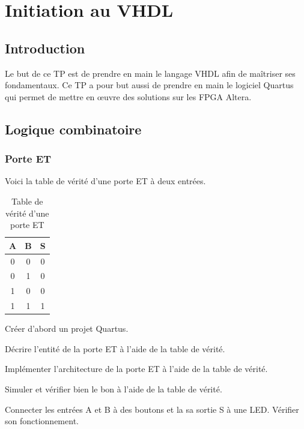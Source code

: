 \chapter*{Initiation au VHDL}
\setcounter{page}{1}
\section{Introduction}
Le but de ce TP est de prendre en main le langage VHDL afin de maîtriser ses fondamentaux. Ce TP a pour but aussi de prendre en main le logiciel Quartus qui permet de mettre en œuvre des solutions sur les FPGA Altera.
\section{Logique combinatoire}
\subsection{Porte ET}
Voici la table de vérité d'une porte ET à deux entrées.
\begin{table}[ht]
    \centering
    \begin{tabular}{c c|c} 
        A & B & S \\
        \hline
        0 & 0 & 0 \\
        0 & 1 & 0 \\
        1 & 0 & 0 \\
        1 & 1 & 1
    \end{tabular}
    \caption{Table de vérité d'une porte ET}
\end{table}

Créer d'abord un projet Quartus.

\medskip

Décrire l'entité de la porte ET à l'aide de la table de vérité.

\medskip

Implémenter l'architecture de la porte ET à l'aide de la table de vérité.

\medskip

Simuler et vérifier bien le bon à l'aide de la table de vérité.

\medskip

Connecter les entrées A et B à des boutons et la sa sortie S à une LED. Vérifier son fonctionnement.
